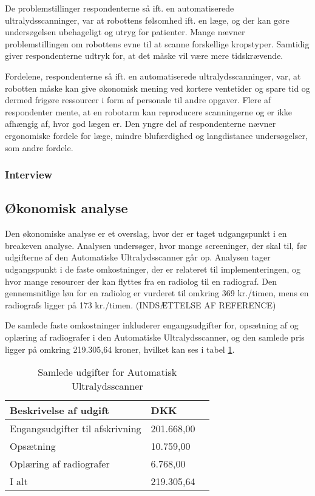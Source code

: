 De problemstillinger respondenterne så ift. en automatiserede ultralydsscanninger, var at robottens følsomhed ift. en læge, og der kan gøre undersøgelsen ubehageligt og utryg for patienter. Mange nævner problemstillingen om robottens evne til at scanne forskellige kropstyper. Samtidig giver respondenterne udtryk for, at det måske vil være mere tidskrævende. 

Fordelene, respondenterne så ift. en automatiserede ultralydsscanninger, var, at robotten måske kan give økonomisk mening ved kortere ventetider og spare tid og dermed frigøre ressourcer i form af personale til andre opgaver. Flere af respondenter mente, at en robotarm kan reproducere scanningerne og er ikke afhængig af, hvor god lægen er. Den yngre del af respondenterne nævner ergonomiske fordele for læge, mindre blufærdighed og langdistance undersøgelser, som andre fordele. 

\subsubsection{Interview}


\subsection{Økonomisk analyse}
Den økonomiske analyse er et overslag, hvor der er taget udgangspunkt i en breakeven analyse. Analysen undersøger, hvor mange screeninger, der skal til, før udgifterne af den Automatiske Ultralydsscanner går op. Analysen tager udgangspunkt i de faste omkostninger, der er relateret til implementeringen, og hvor mange resourcer der kan flyttes fra en radiolog til en radiograf. Den gennemsnitlige løn for en radiolog er vurderet til omkring 369 kr./timen, mens en radiografs ligger på 173 kr./timen. (INDSÆTTELSE AF REFERENCE)

De samlede faste omkostninger inkluderer engangsudgifter for, opsætning af og oplæring af radiografer i den Automatiske Ultralydsscanner, og den samlede pris ligger på omkring 219.305,64 kroner, hvilket kan ses i tabel \ref{FasteOmkostninger}.  

\begin{table}[htb]
\begin{tabular}{ | l | l | p{} | }
\hline
\textbf{Beskrivelse af udgift} & \textbf{DKK} \\\hline
Engangsudgifter til afskrivning & 201.668,00 \\\hline
Opsætning & 10.759,00 \\\hline
Oplæring af radiografer & 6.768,00 \\\hline
I alt & 219.305,64 \\\hline
\end{tabular}
\caption{Samlede udgifter for Automatisk Ultralydsscanner}
\label{FasteOmkostninger}
\end{table}

